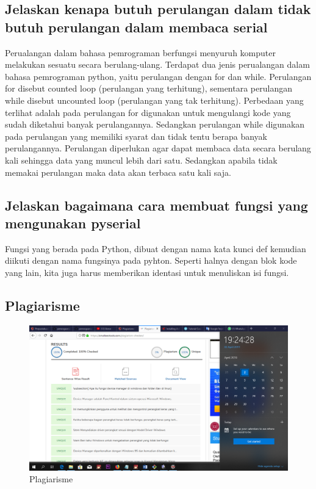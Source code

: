 \subsection{Jelaskan kenapa butuh perulangan dalam tidak butuh perulangan dalam membaca serial}
Perualangan dalam bahasa pemrograman berfungsi menyuruh komputer melakukan sesuatu secara berulang-ulang. Terdapat dua jenis perualangan dalam bahasa pemrograman python, yaitu perulangan dengan for dan while.
Perulangan for disebut counted loop (perulangan yang terhitung), sementara perulangan while disebut uncounted loop (perulangan yang tak terhitung). Perbedaan yang terlihat adalah pada perulangan for digunakan untuk mengulangi kode yang sudah diketahui banyak perulangannya. Sedangkan perulangan while digunakan pada perulangan yang memiliki syarat dan tidak tentu berapa banyak perulangannya.
Perulangan diperlukan agar dapat membaca data secara berulang kali sehingga data yang muncul lebih dari satu.  Sedangkan apabila tidak memakai perulangan maka data akan terbaca satu kali saja.

\subsection{Jelaskan bagaimana cara membuat fungsi yang mengunakan pyserial}
Fungsi yang berada pada Python, dibuat dengan nama kata kunci def kemudian diikuti dengan nama fungsinya pada pyhton.
Seperti halnya dengan blok kode yang lain, kita juga harus memberikan identasi untuk menuliskan isi fungsi.

\subsection{Plagiarisme}
\begin{figure}[h]
\centering
\includegraphics[scale=0.2]{figures/5/Teori/1174056/plagiat.png}
\caption{Plagiarisme}
\label{fig:plagiat}
\end{figure}

